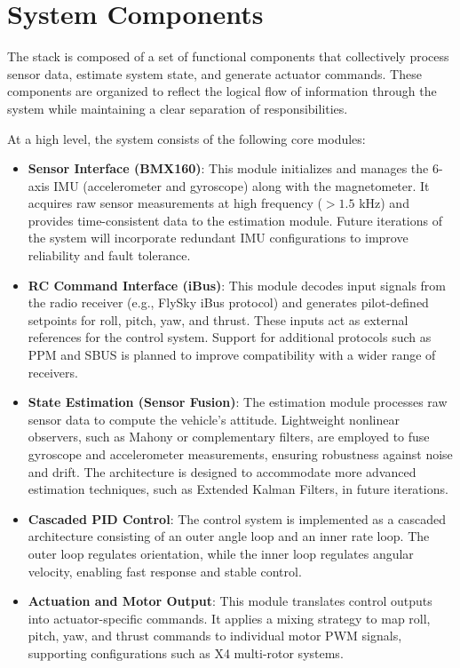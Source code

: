 \section{System Components}
\label{sec:component}

The stack is composed of a set of functional components that collectively process sensor data, estimate system state, and generate actuator commands. These components are organized to reflect the logical flow of information through the system while maintaining a clear separation of responsibilities.
 
At a high level, the system consists of the following core modules:

\begin{itemize}
   \item \textbf{Sensor Interface (BMX160)}:  
    This module initializes and manages the 6-axis IMU (accelerometer and gyroscope) along with the magnetometer. It acquires raw sensor measurements at high frequency ($>1.5$ kHz) and provides time-consistent data to the estimation module. 
    Future iterations of the system will incorporate redundant IMU configurations to improve reliability and fault tolerance.

    \item \textbf{RC Command Interface (iBus)}:  
    This module decodes input signals from the radio receiver (e.g., FlySky iBus protocol) and generates pilot-defined setpoints for roll, pitch, yaw, and thrust. These inputs act as external references for the control system. 
    Support for additional protocols such as PPM and SBUS is planned to improve compatibility with a wider range of receivers.

    \item \textbf{State Estimation (Sensor Fusion)}:  
    The estimation module processes raw sensor data to compute the vehicle's attitude. Lightweight nonlinear observers, such as Mahony or complementary filters, are employed to fuse gyroscope and accelerometer measurements, ensuring robustness against noise and drift. 
    The architecture is designed to accommodate more advanced estimation techniques, such as Extended Kalman Filters, in future iterations.

    \item \textbf{Cascaded PID Control}:  
    The control system is implemented as a cascaded architecture consisting of an outer angle loop and an inner rate loop. The outer loop regulates orientation, while the inner loop regulates angular velocity, enabling fast response and stable control.

    \item \textbf{Actuation and Motor Output}:  
    This module translates control outputs into actuator-specific commands. It applies a mixing strategy to map roll, pitch, yaw, and thrust commands to individual motor PWM signals, supporting configurations such as X4 multi-rotor systems.
\end{itemize}


